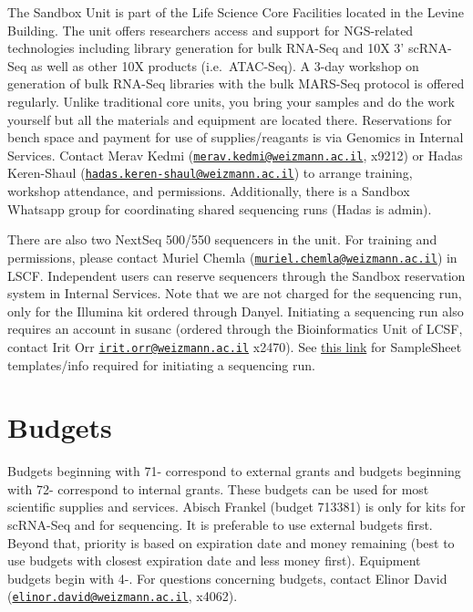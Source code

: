 \documentclass[]{book}
\begin{document}
The Sandbox Unit is part of the Life Science Core Facilities located in
the Levine Building. The unit offers researchers access and support for
NGS-related technologies including library generation for bulk RNA-Seq
and 10X 3' scRNA-Seq as well as other 10X products (i.e.~ATAC-Seq). A
3-day workshop on generation of bulk RNA-Seq libraries with the bulk
MARS-Seq protocol is offered regularly. Unlike traditional core units,
you bring your samples and do the work yourself but all the materials
and equipment are located there. Reservations for bench space and
payment for use of supplies/reagants is via Genomics in Internal
Services. Contact Merav Kedmi
(\href{mailto:merav.kedmi@weizmann.ac.il}{\nolinkurl{merav.kedmi@weizmann.ac.il}},
x9212) or Hadas Keren-Shaul
(\href{mailto:hadas.keren-shaul@weizmann.ac.il}{\nolinkurl{hadas.keren-shaul@weizmann.ac.il}})
to arrange training, workshop attendance, and permissions. Additionally,
there is a Sandbox Whatsapp group for coordinating shared sequencing
runs (Hadas is admin).

There are also two NextSeq 500/550 sequencers in the unit. For training
and permissions, please contact Muriel Chemla
(\href{mailto:muriel.chemla@weizmann.ac.il}{\nolinkurl{muriel.chemla@weizmann.ac.il}})
in LSCF. Independent users can reserve sequencers through the Sandbox
reservation system in Internal Services. Note that we are not charged
for the sequencing run, only for the Illumina kit ordered through
Danyel. Initiating a sequencing run also requires an account in susanc
(ordered through the Bioinformatics Unit of LCSF, contact Irit Orr
\href{mailto:irit.orr@weizmann.ac.il}{\nolinkurl{irit.orr@weizmann.ac.il}}
x2470). See
\href{https://susanc.weizmann.ac.il/static/doc//howto.html}{this link}
for SampleSheet templates/info required for initiating a sequencing run.

\chapter{Budgets}\label{budgets}

Budgets beginning with 71- correspond to external grants and budgets
beginning with 72- correspond to internal grants. These budgets can be
used for most scientific supplies and services. Abisch Frankel (budget
713381) is only for kits for scRNA-Seq and for sequencing. It is
preferable to use external budgets first. Beyond that, priority is based
on expiration date and money remaining (best to use budgets with closest
expiration date and less money first). Equipment budgets begin with 4-.
For questions concerning budgets, contact Elinor David
(\href{mailto:elinor.david@weizmann.ac.il}{\nolinkurl{elinor.david@weizmann.ac.il}},
x4062).
\end{document}
